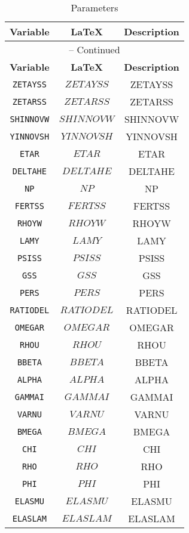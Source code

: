\begin{center}
\begin{longtable}{ccc}
\caption{Parameters}\\%
\hline%
\multicolumn{1}{c}{\textbf{Variable}} &
\multicolumn{1}{c}{\textbf{\LaTeX}} &
\multicolumn{1}{c}{\textbf{Description}}\\%
\hline\hline%
\endfirsthead
\multicolumn{3}{c}{{\tablename} \thetable{} -- Continued}\\%
\hline%
\multicolumn{1}{c}{\textbf{Variable}} &
\multicolumn{1}{c}{\textbf{\LaTeX}} &
\multicolumn{1}{c}{\textbf{Description}}\\%
\hline\hline%
\endhead
\texttt{ZETAYSS} & $ZETAYSS$ & ZETAYSS\\
\texttt{ZETARSS} & $ZETARSS$ & ZETARSS\\
\texttt{SHINNOVW} & $SHINNOVW$ & SHINNOVW\\
\texttt{YINNOVSH} & $YINNOVSH$ & YINNOVSH\\
\texttt{ETAR} & $ETAR$ & ETAR\\
\texttt{DELTAHE} & $DELTAHE$ & DELTAHE\\
\texttt{NP} & $NP$ & NP\\
\texttt{FERTSS} & $FERTSS$ & FERTSS\\
\texttt{RHOYW} & $RHOYW$ & RHOYW\\
\texttt{LAMY} & $LAMY$ & LAMY\\
\texttt{PSISS} & $PSISS$ & PSISS\\
\texttt{GSS} & $GSS$ & GSS\\
\texttt{PERS} & $PERS$ & PERS\\
\texttt{RATIODEL} & $RATIODEL$ & RATIODEL\\
\texttt{OMEGAR} & $OMEGAR$ & OMEGAR\\
\texttt{RHOU} & $RHOU$ & RHOU\\
\texttt{BBETA} & $BBETA$ & BBETA\\
\texttt{ALPHA} & $ALPHA$ & ALPHA\\
\texttt{GAMMAI} & $GAMMAI$ & GAMMAI\\
\texttt{VARNU} & $VARNU$ & VARNU\\
\texttt{BMEGA} & $BMEGA$ & BMEGA\\
\texttt{CHI} & $CHI$ & CHI\\
\texttt{RHO} & $RHO$ & RHO\\
\texttt{PHI} & $PHI$ & PHI\\
\texttt{ELASMU} & $ELASMU$ & ELASMU\\
\texttt{ELASLAM} & $ELASLAM$ & ELASLAM\\

\end{longtable}
\end{center}
